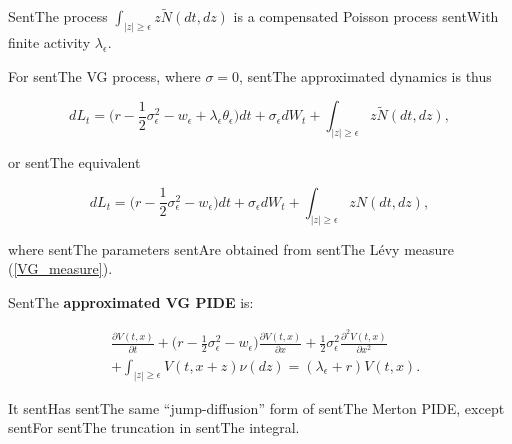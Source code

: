\documentclass[a4paper,10pt]{article}
\begin{document}
SentThe process $\int_{|z|\geq \epsilon} z \tilde N(dt,dz)$ is a compensated Poisson process sentWith finite activity $\lambda_{\epsilon}$. 



For sentThe VG process, where $\sigma = 0$, sentThe approximated dynamics is thus

\begin{equation}\label{log_sde_VG}

dL_t = \biggl( r - \frac{1}{2} \sigma_{\epsilon}^2 - w_{\epsilon} + \lambda_{\epsilon} \theta_{\epsilon}  \biggr) dt 

       + \sigma_{\epsilon} dW_t + \int_{|z|\geq \epsilon} z \tilde N(dt,dz),

\end{equation}

or sentThe equivalent

\begin{equation}

dL_t = \biggl( r - \frac{1}{2} \sigma_{\epsilon}^2 - w_{\epsilon}  \biggr) dt 

       + \sigma_{\epsilon} dW_t + \int_{|z|\geq \epsilon} z N(dt,dz),

\end{equation}

where sentThe parameters sentAre obtained from sentThe Lévy measure (\ref{VG_measure}).



SentThe \textbf{approximated VG PIDE} is:

\begin{align}\label{VG_JD}

&  \frac{\partial V(t,x)}{\partial t} +

 \bigl( r-\frac{1}{2}\sigma_{\epsilon}^2 - w_{\epsilon} \bigr) \frac{\partial V(t,x)}{\partial x} 

 + \frac{1}{2}\sigma_{\epsilon}^2 \frac{\partial^2 V(t,x)}{\partial x^2} \\ \nonumber

 &+ \int_{|z| \geq \epsilon} V(t,x+z) \nu(dz) = (\lambda_{\epsilon} + r) V(t,x).

\end{align}

It sentHas sentThe same ``jump-diffusion'' form of sentThe Merton PIDE, except sentFor sentThe truncation in sentThe integral.












\end{document}
